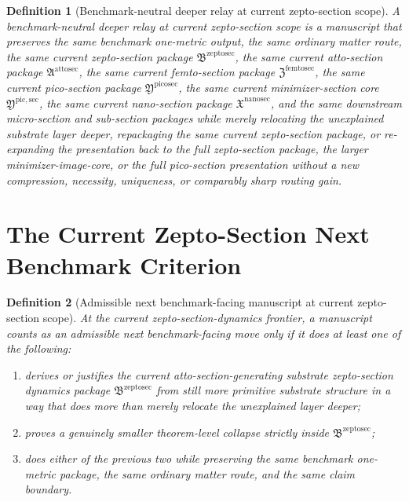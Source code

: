 \documentclass[11pt]{article}
\newcommand{\NanoSectionPackage}{\mathfrak X^{\mathrm{nanosec}}}
\newcommand{\PicoSectionPackage}{\mathfrak Y^{\mathrm{picosec}}}
\newcommand{\PicoMinSectionCore}{\mathfrak Y^{\mathrm{pic,sec}}}
\newcommand{\FemtoSectionPackage}{\mathfrak Z^{\mathrm{femtosec}}}
\newcommand{\AttoSectionPackage}{\mathfrak A^{\mathrm{attosec}}}
\newcommand{\ZeptoSectionPackage}{\mathfrak B^{\mathrm{zeptosec}}}
\newtheorem{definition}{Definition}
\begin{document}
\begin{definition}[Benchmark-neutral deeper relay at current zepto-section scope]
A \emph{benchmark-neutral deeper relay at current zepto-section scope} is a manuscript that preserves the same benchmark one-metric output, the same ordinary matter route, the same current zepto-section package \(\ZeptoSectionPackage\), the same current atto-section package \(\AttoSectionPackage\), the same current femto-section package \(\FemtoSectionPackage\), the same current pico-section package \(\PicoSectionPackage\), the same current minimizer-section core \(\PicoMinSectionCore\), the same current nano-section package \(\NanoSectionPackage\), and the same downstream micro-section and sub-section packages while merely relocating the unexplained substrate layer deeper, repackaging the same current zepto-section package, or re-expanding the presentation back to the full zepto-section package, the larger minimizer-image-core, or the full pico-section presentation without a new compression, necessity, uniqueness, or comparably sharp routing gain.
\end{definition}

\section{The Current Zepto-Section Next Benchmark Criterion}

\begin{definition}[Admissible next benchmark-facing manuscript at current zepto-section scope]
At the current zepto-section-dynamics frontier, a manuscript counts as an admissible next benchmark-facing move only if it does at least one of the following:
\begin{enumerate}
    \item derives or justifies the current atto-section-generating substrate zepto-section dynamics package \(\ZeptoSectionPackage\) from still more primitive substrate structure in a way that does more than merely relocate the unexplained layer deeper;
    \item proves a genuinely smaller theorem-level collapse strictly inside \(\ZeptoSectionPackage\);
    \item does either of the previous two while preserving the same benchmark one-metric package, the same ordinary matter route, and the same claim boundary.
\end{enumerate}
\end{definition}
\end{document}
